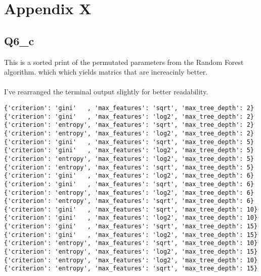 \section{Appendix X}
\subsection{Q6\_c}

This is a sorted print of the permutated parameters from the Random Forest algorithm. which
which yields matrics that are increacinly better.
\\
\\
I've rearranged the terminal output slightly for better readability.

\begin{verbatim}
{'criterion': 'gini'   , 'max_features': 'sqrt', 'max_tree_depth': 2}
{'criterion': 'gini'   , 'max_features': 'log2', 'max_tree_depth': 2}
{'criterion': 'entropy', 'max_features': 'sqrt', 'max_tree_depth': 2}
{'criterion': 'entropy', 'max_features': 'log2', 'max_tree_depth': 2}
{'criterion': 'gini'   , 'max_features': 'sqrt', 'max_tree_depth': 5}
{'criterion': 'gini'   , 'max_features': 'log2', 'max_tree_depth': 5}
{'criterion': 'entropy', 'max_features': 'log2', 'max_tree_depth': 5}
{'criterion': 'entropy', 'max_features': 'sqrt', 'max_tree_depth': 5}
{'criterion': 'gini'   , 'max_features': 'log2', 'max_tree_depth': 6}
{'criterion': 'gini'   , 'max_features': 'sqrt', 'max_tree_depth': 6}
{'criterion': 'entropy', 'max_features': 'log2', 'max_tree_depth': 6}
{'criterion': 'entropy', 'max_features': 'sqrt', 'max_tree_depth': 6}
{'criterion': 'gini'   , 'max_features': 'sqrt', 'max_tree_depth': 10}
{'criterion': 'gini'   , 'max_features': 'log2', 'max_tree_depth': 10}
{'criterion': 'gini'   , 'max_features': 'sqrt', 'max_tree_depth': 15}
{'criterion': 'gini'   , 'max_features': 'log2', 'max_tree_depth': 15}
{'criterion': 'entropy', 'max_features': 'sqrt', 'max_tree_depth': 10}
{'criterion': 'entropy', 'max_features': 'log2', 'max_tree_depth': 15}
{'criterion': 'entropy', 'max_features': 'log2', 'max_tree_depth': 10}
{'criterion': 'entropy', 'max_features': 'sqrt', 'max_tree_depth': 15}
\end{verbatim}

\newpage